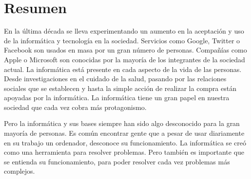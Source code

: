 

\setcounter{page}{3}








\chapter*{Resumen} %


En la última década se lleva experimentando un aumento en la aceptación y uso de la informática y tecnología en la sociedad. Servicios como Google, Twitter o Facebook son usados en masa por un gran número de personas. Compañías como Apple o Microsoft son conocidas por la mayoría de los integrantes de la sociedad actual. La informática está presente en cada aspecto de la vida de las personas. Desde investigaciones en el cuidado de la salud, pasando por las relaciones sociales que se establecen y hasta la simple acción de realizar la compra están apoyadas por la informática. La informática tiene un gran papel en nuestra sociedad que cada vez cobra más protagonismo. 

Pero la informática y sus bases siempre han sido algo desconocido para la gran mayoría de personas. Es común encontrar gente que a pesar de usar diariamente en su trabajo un ordenador, desconoce su funcionamiento. La informática se creó como una herramienta para resolver problemas. Pero también es importante que se entienda su funcionamiento, para poder resolver cada vez problemas más complejos.

